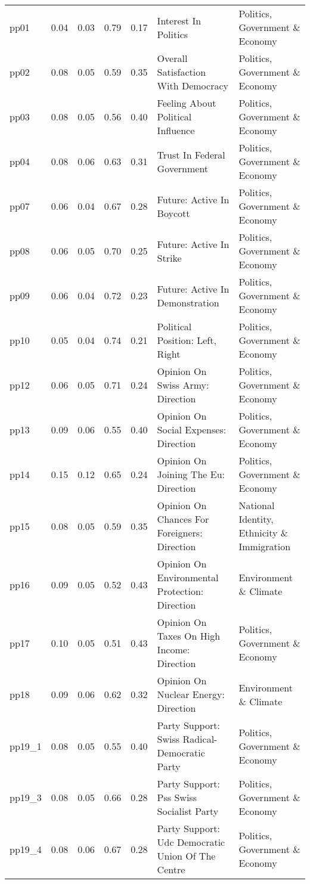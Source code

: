 \begin{longtable}{l|rrrrll}
pp01 & 0.04 & 0.03 & 0.79 & 0.17 & Interest In Politics & Politics, Government \& Economy \\ 
pp02 & 0.08 & 0.05 & 0.59 & 0.35 & Overall Satisfaction With Democracy & Politics, Government \& Economy \\ 
pp03 & 0.08 & 0.05 & 0.56 & 0.40 & Feeling About Political Influence & Politics, Government \& Economy \\ 
pp04 & 0.08 & 0.06 & 0.63 & 0.31 & Trust In Federal Government & Politics, Government \& Economy \\ 
pp07 & 0.06 & 0.04 & 0.67 & 0.28 & Future: Active In Boycott & Politics, Government \& Economy \\ 
pp08 & 0.06 & 0.05 & 0.70 & 0.25 & Future: Active In Strike & Politics, Government \& Economy \\ 
pp09 & 0.06 & 0.04 & 0.72 & 0.23 & Future: Active In Demonstration & Politics, Government \& Economy \\ 
pp10 & 0.05 & 0.04 & 0.74 & 0.21 & Political Position: Left, Right & Politics, Government \& Economy \\ 
pp12 & 0.06 & 0.05 & 0.71 & 0.24 & Opinion On Swiss Army: Direction & Politics, Government \& Economy \\ 
pp13 & 0.09 & 0.06 & 0.55 & 0.40 & Opinion On Social Expenses: Direction & Politics, Government \& Economy \\ 
pp14 & 0.15 & 0.12 & 0.65 & 0.24 & Opinion On Joining The Eu: Direction & Politics, Government \& Economy \\ 
pp15 & 0.08 & 0.05 & 0.59 & 0.35 & Opinion On Chances For Foreigners: Direction & National Identity, Ethnicity \& Immigration \\ 
pp16 & 0.09 & 0.05 & 0.52 & 0.43 & Opinion On Environmental Protection: Direction & Environment \& Climate \\ 
pp17 & 0.10 & 0.05 & 0.51 & 0.43 & Opinion On Taxes On High Income: Direction & Politics, Government \& Economy \\ 
pp18 & 0.09 & 0.06 & 0.62 & 0.32 & Opinion On Nuclear Energy: Direction & Environment \& Climate \\ 
pp19\_1 & 0.08 & 0.05 & 0.55 & 0.40 & Party Support: Swiss Radical-Democratic Party & Politics, Government \& Economy \\ 
pp19\_3 & 0.08 & 0.05 & 0.66 & 0.28 & Party Support: Pss Swiss Socialist Party & Politics, Government \& Economy \\ 
pp19\_4 & 0.08 & 0.06 & 0.67 & 0.28 & Party Support: Udc Democratic Union Of The Centre & Politics, Government \& Economy \\ 

\end{longtable}
